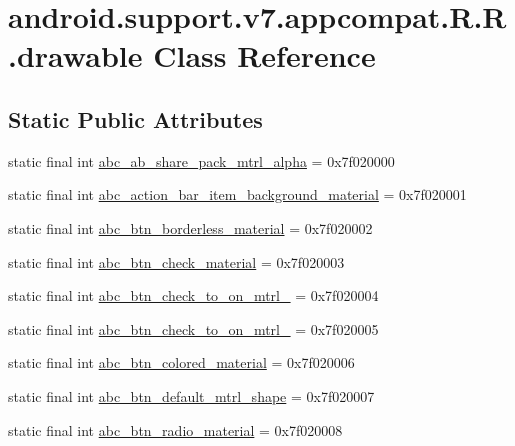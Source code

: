 \hypertarget{classandroid_1_1support_1_1v7_1_1appcompat_1_1_r_1_1drawable}{
\section{android.support.v7.appcompat.R.R.drawable Class Reference}
\label{classandroid_1_1support_1_1v7_1_1appcompat_1_1_r_1_1drawable}
}
\subsection*{Static Public Attributes}
\begin{CompactItemize}
\item 
static final int \hyperlink{classandroid_1_1support_1_1v7_1_1appcompat_1_1_r_1_1drawable_5f441fca96ea3fc83611c040f114f1b2}{abc\_\-ab\_\-share\_\-pack\_\-mtrl\_\-alpha} = 0x7f020000
\item 
static final int \hyperlink{classandroid_1_1support_1_1v7_1_1appcompat_1_1_r_1_1drawable_5e6406a697c4806d5e2804646e8db7e2}{abc\_\-action\_\-bar\_\-item\_\-background\_\-material} = 0x7f020001
\item 
static final int \hyperlink{classandroid_1_1support_1_1v7_1_1appcompat_1_1_r_1_1drawable_309b0d3332835c994b3c2ff179ea5ba0}{abc\_\-btn\_\-borderless\_\-material} = 0x7f020002
\item 
static final int \hyperlink{classandroid_1_1support_1_1v7_1_1appcompat_1_1_r_1_1drawable_d04d1c960025c441285f56ba1804b9f7}{abc\_\-btn\_\-check\_\-material} = 0x7f020003
\item 
static final int \hyperlink{classandroid_1_1support_1_1v7_1_1appcompat_1_1_r_1_1drawable_00bd71e67133a2547dc9276ecef35e9b}{abc\_\-btn\_\-check\_\-to\_\-on\_\-mtrl\_} = 0x7f020004
\item 
static final int \hyperlink{classandroid_1_1support_1_1v7_1_1appcompat_1_1_r_1_1drawable_a111e48f49a24acb31c7497566422921}{abc\_\-btn\_\-check\_\-to\_\-on\_\-mtrl\_} = 0x7f020005
\item 
static final int \hyperlink{classandroid_1_1support_1_1v7_1_1appcompat_1_1_r_1_1drawable_751bdc2b9d65766c8bf9041a5c4a04b8}{abc\_\-btn\_\-colored\_\-material} = 0x7f020006
\item 
static final int \hyperlink{classandroid_1_1support_1_1v7_1_1appcompat_1_1_r_1_1drawable_d2b5d9e62bb316d88aa040e4feae729b}{abc\_\-btn\_\-default\_\-mtrl\_\-shape} = 0x7f020007
\item 
static final int \hyperlink{classandroid_1_1support_1_1v7_1_1appcompat_1_1_r_1_1drawable_11e996924c7d4256c038edce09f82a5c}{abc\_\-btn\_\-radio\_\-material} = 0x7f020008

\end{CompactItemize}
